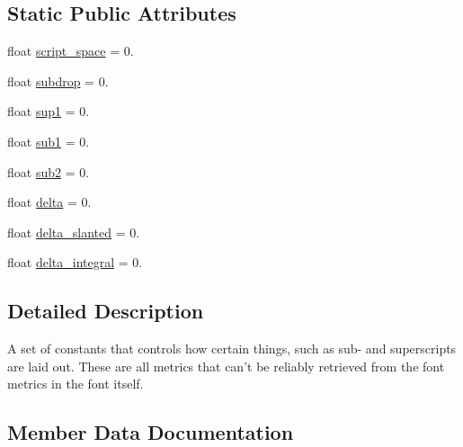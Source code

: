 \subsection*{Static Public Attributes}
\begin{DoxyCompactItemize}
\item 
float \hyperlink{classmatplotlib_1_1__mathtext_1_1FontConstantsBase_ac5be6a656337c72efe10b34824fe0aec}{script\+\_\+space} = 0.
\item 
float \hyperlink{classmatplotlib_1_1__mathtext_1_1FontConstantsBase_a2860de3caa4bfa73b141c10043ee59b4}{subdrop} = 0.
\item 
float \hyperlink{classmatplotlib_1_1__mathtext_1_1FontConstantsBase_ade092be64bba7f65e1a47ca453a1aee3}{sup1} = 0.
\item 
float \hyperlink{classmatplotlib_1_1__mathtext_1_1FontConstantsBase_a65fd03cc41d020951e3f4219b14d4271}{sub1} = 0.
\item 
float \hyperlink{classmatplotlib_1_1__mathtext_1_1FontConstantsBase_a57c5c8a9123f40e76235e1cde460eb9c}{sub2} = 0.
\item 
float \hyperlink{classmatplotlib_1_1__mathtext_1_1FontConstantsBase_aefaf7ddebca50d897e36e00408d686c3}{delta} = 0.
\item 
float \hyperlink{classmatplotlib_1_1__mathtext_1_1FontConstantsBase_a93a304bc7230e80a7b8f7c8038979b4d}{delta\+\_\+slanted} = 0.
\item 
float \hyperlink{classmatplotlib_1_1__mathtext_1_1FontConstantsBase_ac121f6e092f979e3756df58db9528213}{delta\+\_\+integral} = 0.
\end{DoxyCompactItemize}


\subsection{Detailed Description}
\begin{DoxyVerb}A set of constants that controls how certain things, such as sub-
and superscripts are laid out.  These are all metrics that can't
be reliably retrieved from the font metrics in the font itself.
\end{DoxyVerb}
 

\subsection{Member Data Documentation}
\mbox{\label{classmatplotlib_1_1__mathtext_1_1FontConstantsBase_aefaf7ddebca50d897e36e00408d686c3}} 
